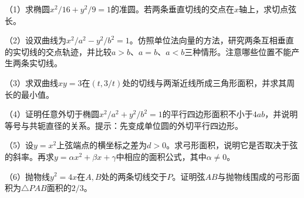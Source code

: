 \begin{exercise}
\mbox{}\par\nobreak
\begin{samepage}
（1）求椭圆\(x^2/16+y^2/9=1\)的准圆。若两条垂直切线的交点在\(x\)轴上，求切点弦长。
\par
\end{samepage}

\begin{samepage}
（2）设双曲线为\(x^2/a^2-y^2/b^2=1\)。仿照单位法向量的方法，研究两条互相垂直的实切线的交点轨迹，并比较\(a>b\)、\(a=b\)、\(a<b\)三种情形。注意哪些位置不能产生两条实切线。
\par
\end{samepage}

\begin{samepage}
（3）求双曲线\(xy=3\)在\((t,3/t)\)处的切线与两渐近线所成三角形面积，并求其周长的最小值。
\par
\end{samepage}

\begin{samepage}
（4）证明任意外切于椭圆\(x^2/a^2+y^2/b^2=1\)的平行四边形面积不小于\(4ab\)，并说明等号与共轭直径的关系。提示：先变成单位圆的外切平行四边形。
\par
\end{samepage}

\begin{samepage}
（5）设\(y=x^2\)上弦端点的横坐标之差为\(d>0\)。求弓形面积，说明它是否取决于弦的斜率。再求\(y=\alpha x^2+\beta x+\gamma\)中相应的面积公式，其中\(\alpha\ne0\)。
\par
\end{samepage}

\begin{samepage}
（6）抛物线\(y^2=4x\)在\(A,B\)处的两条切线交于\(P\)。证明弦\(AB\)与抛物线围成的弓形面积为\(\triangle PAB\)面积的\(2/3\)。
\par
\end{samepage}
\end{exercise}
